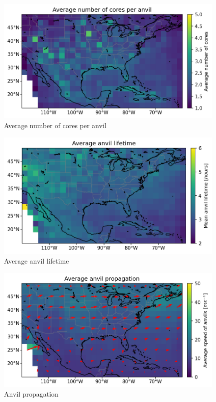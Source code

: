 \begin{figure}[tp]
    \centering
    \includegraphics[width=\textwidth]{figures/ch2_13.png}
    \caption{Average number of cores per anvil}
    \label{fig:anvil_number_of_cores_map}
\end{figure}

\begin{figure}[tp]
    \centering
    \includegraphics[width=\textwidth]{figures/ch2_14.png}
    \caption{Average anvil lifetime}
    \label{fig:anvil_lifetime_map}
\end{figure}

\begin{figure}[tp]
    \centering
    \includegraphics[width=\textwidth]{figures/ch2_15.png}
    \caption{Anvil propagation}
    \label{fig:anvil_propagation_map}
\end{figure}

